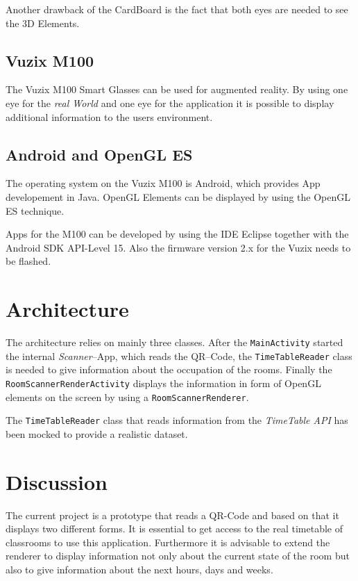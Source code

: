 \documentclass[11pt]{scrartcl}
\begin{document}
\begin{multicols}{2}
			Another drawback of the CardBoard is the fact that both eyes are needed to see the 3D Elements.   
		
		\subsection{Vuzix M100}
			The Vuzix M100 Smart Glasses can be used for augmented reality. By using one eye for the \emph{real World} and one eye for the application it is possible to display additional information to the users environment.
		
		\subsection{Android and OpenGL ES}
			The operating system on the Vuzix M100 is Android, which provides App developement in Java. OpenGL Elements can be displayed by using the OpenGL ES technique.
	
			Apps for the M100 can be developed by using the IDE Eclipse together with the Android SDK API-Level 15. Also the firmware version 2.x for the Vuzix needs to be flashed.

	\section{Architecture}
		The architecture relies on mainly three classes. After the \texttt{MainActivity} started the internal \emph{Scanner}--App, which reads the QR--Code, the \texttt{TimeTableReader} class is needed to give information about the occupation of the rooms. Finally the \texttt{RoomScannerRenderActivity} displays the information in form of OpenGL elements on the screen by using a \texttt{RoomScannerRenderer}.
		
		The \texttt{TimeTableReader} class that reads information from the \emph{TimeTable API} has been mocked to provide a realistic dataset.
		
	\section{Discussion}
		The current project is a prototype that reads a QR-Code and based on that it displays two different forms. It is essential to get access to the real timetable of classrooms to use this application. Furthermore it is advisable to extend the renderer to display information not only about the current state of the room but also to give information about the next hours, days and weeks.
		

\end{multicols}
\end{document}
